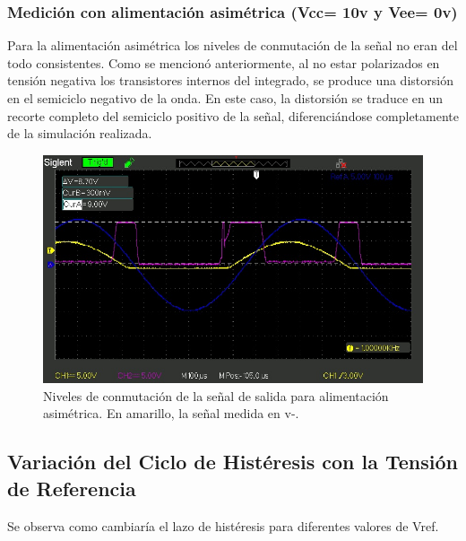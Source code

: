 \subsubsection{Medición con alimentación asimétrica (Vcc= 10v y Vee= 0v)}
Para la alimentación asimétrica los niveles de conmutación de la señal no eran del todo consistentes. Como se mencionó anteriormente, al no estar polarizados en tensión negativa los transistores internos del integrado, se produce una distorsión en el semiciclo negativo de la onda. En este caso, la distorsión se traduce en un recorte completo del semiciclo positivo de la señal, diferenciándose completamente de la simulación realizada.

\begin{figure}[H]
    \centering
    \includegraphics[width=0.75\linewidth]{Secciones/Circuito4/SDS00010.jpg}
    \caption{Niveles de conmutación de la señal de salida para alimentación asimétrica. En amarillo, la señal medida en v-.}
    \label{fig:enter-label}
\end{figure}

\subsection{Variación del Ciclo de Histéresis con la Tensión de Referencia}

Se observa como cambiaría el lazo de histéresis para diferentes valores de Vref.

